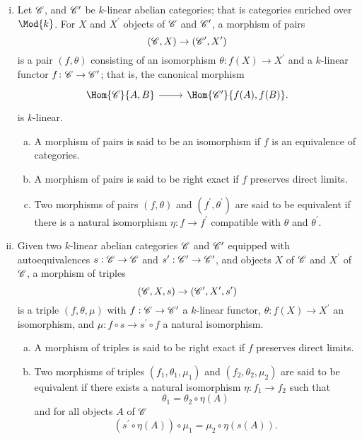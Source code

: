 \documentclass[10pt]{amsart}
\begin{document}
\begin{defn}
  \begin{enumerate}[(i)]
  \item
    Let $\mathscr{C}$, and $\mathscr{C}^\prime$ be $k$-linear abelian categories; that is categories enriched over $\Mod{k}$.
    For $X$ and $X^\prime$ objects of $\mathscr{C}$ and $\mathscr{C}^\prime$, a morphism of pairs
    $$(\mathscr{C}, X) \rightarrow (\mathscr{C}^\prime, X^\prime)$$
    is a pair $(f, \theta)$ consisting of an isomorphism $\theta \colon f(X) \rightarrow X^\prime$ and a $k$-linear functor $f \colon \mathscr{C} \rightarrow \mathscr{C}^\prime$; that is, the canonical morphism
    $$\begin{tikzcd}
      \Hom{\C}{A,B}\arrow{r}& \Hom{\C^\prime}{f(A), f(B)}.
    \end{tikzcd}$$
    is $k$-linear.
    \begin{enumerate}[(a)]
    \item
      A morphism of pairs is said to be an isomorphism if $f$ is an equivalence of categories.
    \item
      A morphism of pairs is said to be right exact if $f$ preserves direct limits.
    \item
      Two morphisms of pairs $(f,\theta)$ and $(f^\prime, \theta^\prime)$ are said to be equivalent if there is a natural isomorphism $\eta \colon f \rightarrow f^\prime$ compatible with $\theta$ and $\theta^\prime$.
    \end{enumerate}
  \item
    Given two $k$-linear abelian categories $\mathscr{C}$ and $\mathscr{C}^\prime$ equipped with autoequivalences $s : \mathscr{C} \rightarrow \mathscr{C}$ and $s^\prime : \mathscr{C}^\prime \rightarrow \mathscr{C}^\prime$, and objects $X$ of $\mathscr{C}$ and $X^\prime$ of $\mathscr{C}$, a morphism of triples
    $$(\mathscr{C}, X, s) \rightarrow (\mathscr{C}^\prime, X^\prime, s^\prime)$$
    is a triple $(f, \theta, \mu)$ with $f : \mathscr{C} \rightarrow \mathscr{C}^\prime$ a $k$-linear functor, $\theta : f(X) \rightarrow X^\prime$ an isomorphism, and $\mu : f \circ s \rightarrow s^\prime \circ f$ a natural isomorphism.
    \begin{enumerate}[(a)]
    \item
      A morphism of triples is said to be right exact if $f$ preserves direct limits.
    \item
      Two morphisms of triples $(f_1, \theta_1, \mu_1)$ and $(f_2, \theta_2, \mu_2)$ are said to be equivalent if there exists a natural isomorphism $\eta : f_1 \rightarrow f_2$ such that
      $$\theta_1 = \theta_2 \circ \eta(A)$$
      and for all objects $A$ of $\mathscr{C}$
      $$(s^\prime \circ \eta(A)) \circ \mu_1 = \mu_2 \circ \eta(s(A)).$$

\end{enumerate}
\end{enumerate}
\end{defn}
\end{document}

